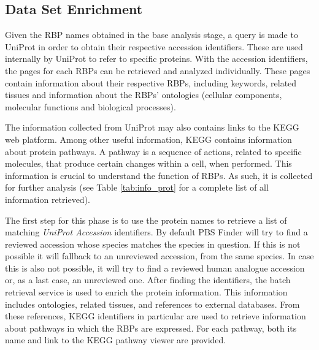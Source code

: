 \subsection{Data Set Enrichment}

Given the RBP names obtained in the base analysis stage, a query is made to
UniProt in order to obtain their respective accession identifiers. These are
used internally by UniProt to refer to specific proteins. With the accession
identifiers, the pages for each RBPs can be retrieved and analyzed individually.
These pages contain information about their respective RBPs, including keywords,
related tissues and information about the RBPs' ontologies (cellular components,
molecular functions and biological processes).

The information collected from UniProt may also contains links to the KEGG web
platform. Among other useful information, KEGG contains information about
protein pathways. A pathway is a sequence of actions, related to specific
molecules, that produce certain changes within a cell, when performed. This
information is crucial to understand the function of RBPs. As such, it is
collected for further analysis (see Table \ref{tab:info_prot} for a complete
list of all information retrieved).

The first step for this phase is to use the protein names to retrieve a list of
matching \emph{UniProt Accession} identifiers. By default PBS Finder will try to
find a reviewed accession whose species matches the species in question. If this
is not possible it will fallback to an unreviewed accession, from the same
species. In case this is also not possible, it will try to find a reviewed human
analogue accession or, as a last case, an unreviewed one. After finding the
identifiers, the batch retrieval service is used to enrich the protein
information. This information includes ontologies, related tissues, and
references to external databases. From these references, KEGG identifiers in
particular are used to retrieve information about pathways in which the RBPs are
expressed. For each pathway, both its name and link to the KEGG pathway viewer
are provided.

